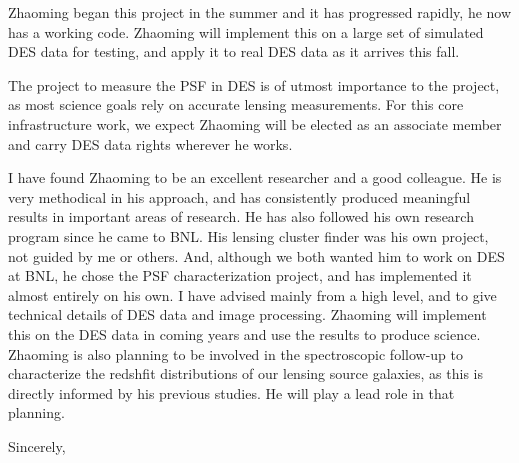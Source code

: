 \documentclass[12pt]{letter}
\begin{document}
\begin{letter}{}
Zhaoming began this project in the summer and it has progressed rapidly, he now
has a working code.  Zhaoming will implement this on a large set of simulated
DES data for testing, and apply it to real DES data as it arrives this fall. 

The project to measure the PSF in DES is of utmost importance to the project,
as most science goals rely on accurate lensing measurements.  For this core
infrastructure work, we expect Zhaoming will be elected as an associate member
and carry DES data rights wherever he works.

I have found Zhaoming to be an excellent researcher and a good colleague.  He
is very methodical in his approach, and has consistently produced meaningful
results in important areas of research.  He has also followed his own research
program since he came to BNL.  His lensing cluster finder was his own project,
not guided by me or others.  And, although we both wanted him to work on DES at
BNL, he chose the PSF characterization project, and has implemented it almost
entirely on his own.  I have advised mainly from a high level, and to give
technical details of DES data and image processing.  Zhaoming will implement
this on the DES data in coming years and use the results to produce science.
Zhaoming is also planning to be involved in the spectroscopic follow-up 
to characterize the redshfit distributions of our lensing source galaxies,
as this is directly informed by his previous studies.  He will play a lead
role in that planning.



\closing{Sincerely, }

\end{letter}
\end{document}

